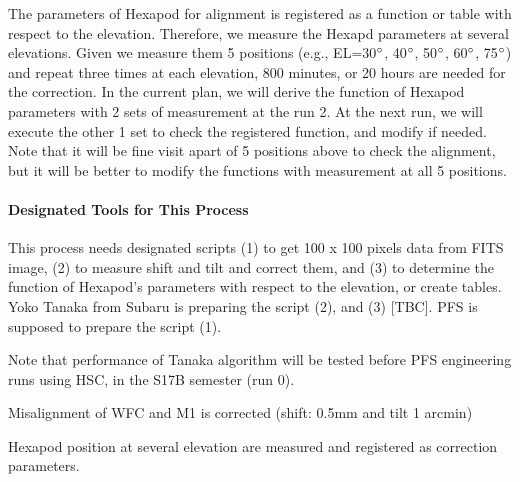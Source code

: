 The parameters of Hexapod for alignment is registered as a function or table with respect to the elevation.
Therefore, we measure the Hexapd parameters at several elevations.
Given we measure them 5 positions (e.g., EL=30$^\circ$, 40$^\circ$, 50$^\circ$, 60$^\circ$, 75$^\circ$) and repeat three times at each elevation, 800 minutes, or 20 hours are needed for the correction.
In the current plan, we will derive the function of Hexapod parameters with 2 sets of measurement at the run 2.
At the next run, we will execute the other 1 set to check the registered function, and modify if needed.
Note that it will be fine visit apart of 5 positions above to check the alignment, but it will be better to modify the functions with measurement at all 5 positions.

\smallskip
\paragraph{Designated Tools for This Process}
This process needs designated scripts
(1) to get 100 x 100 pixels data from FITS image,
(2) to measure shift and tilt and correct them, and
(3) to determine the function of Hexapod's parameters with respect to the elevation, or create tables. 
Yoko Tanaka from Subaru is preparing the script (2), and (3) [TBC].
PFS is supposed to prepare the script (1).

Note that performance of Tanaka algorithm will be tested before PFS engineering runs using HSC, in the S17B semester (run 0).

\begin{itembox}[l]{}
Misalignment of  WFC and M1 is corrected (shift: 0.5mm and tilt 1 arcmin)

Hexapod position at several elevation are measured and registered as correction parameters.

\end{itembox}